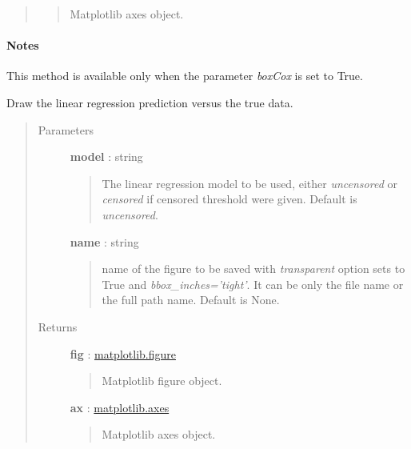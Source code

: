 \documentclass[letterpaper,10pt,english]{sphinxmanual}
\begin{document}
\begin{fulllineitems}
\begin{fulllineitems}
\begin{quote}
\begin{description}
\begin{quote}
Matplotlib axes object.
\end{quote}

\end{description}\end{quote}
\paragraph{Notes}

This method is available only when the parameter \emph{boxCox} is set to True.

\end{fulllineitems}


\begin{fulllineitems}
\label{_generated/otpod.UnivariateLinearModelAnalysis:otpod.UnivariateLinearModelAnalysis.drawLinearModel}
Draw the linear regression prediction versus the true data.
\begin{quote}\begin{description}
\item[{Parameters}] \leavevmode
\textbf{model} : string
\begin{quote}

The linear regression model to be used, either \emph{uncensored} or
\emph{censored} if censored threshold were given. Default is \emph{uncensored}.
\end{quote}

\textbf{name} : string
\begin{quote}

name of the figure to be saved with \emph{transparent} option sets to True
and \emph{bbox\_inches='tight'}. It can be only the file name or the 
full path name. Default is None.
\end{quote}

\item[{Returns}] \leavevmode
\textbf{fig} : \href{http://matplotlib.org/api/figure\_api.html}{matplotlib.figure}
\begin{quote}

Matplotlib figure object.
\end{quote}

\textbf{ax} : \href{http://matplotlib.org/api/axes\_api.html}{matplotlib.axes}
\begin{quote}

Matplotlib axes object.
\end{quote}


\end{description}
\end{quote}
\end{fulllineitems}
\end{fulllineitems}
\end{document}
